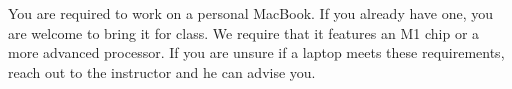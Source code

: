 You are required to work on a personal MacBook. If you already have one, you are welcome to bring it for class. We require that it features an M1 chip or a more advanced processor. If you are unsure if a laptop meets these requirements, reach out to the instructor and he can advise you.
